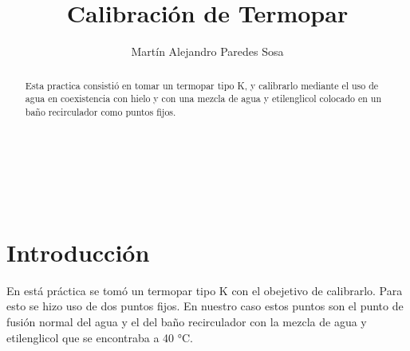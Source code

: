 \documentclass[12pt]{article}
\title{Calibración de Termopar}
\author{Martín Alejandro Paredes Sosa}
\makeatletter
\let\thetitle\@title
\let\theauthor\@author
\makeatother
\begin{document}
\begin{center}
{ \large \bfseries \thetitle}\\
\end{center}
	\begin{minipage}{\textwidth}
		\begin{center} 
			\theauthor 
			\end{center}
	\end{minipage}\\[0.2 cm]
	
\begin{abstract}
	Esta practica consistió en tomar un termopar tipo K, y calibrarlo mediante el uso de agua en coexistencia con hielo y con  una mezcla de agua y etilenglicol colocado en un baño recirculador como puntos fijos.
\end{abstract}
\vspace{-1cm}
\section{Introducción}
En está práctica se tomó un termopar tipo K  con el obejetivo de calibrarlo. Para esto se hizo uso de dos puntos fijos. En nuestro caso estos puntos son el punto de fusión normal del agua y el del baño recirculador con la mezcla de agua y etilenglicol que se encontraba a 40 °C.
\end{document}
